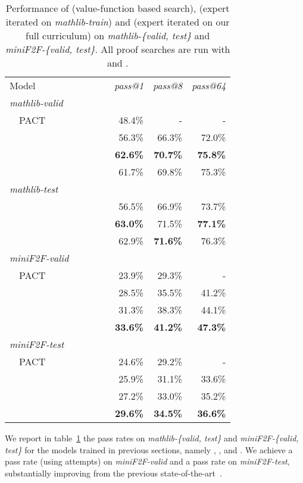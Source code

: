 \documentclass[nohyperref]{article}
\theoremstyle{plain}
\theoremstyle{definition}
\theoremstyle{remark}
\begin{document}
\begin{table}[ht]
\caption{Performance of  (value-function based search),  (expert iterated on \textit{mathlib-train}) and  (expert iterated on our full curriculum) on \textit{mathlib-\{valid, test\}} and \textit{miniF2F-\{valid,  test\}}. All proof searches are run with  and .}
\label{fig:final-results}
\begin{center}
\begin{small}
\begin{tabular}{lrrr}
\toprule
Model & \textit{pass@1} & \textit{pass@8} & \textit{pass@64} \\
\cmidrule(r){1-4}
\multicolumn{4}{l}{\textit{mathlib-valid}} \\
~~PACT~\cite{han2021proof} & 48.4\% & - & - \\
~~~~~~~~~~~~~~~~~~~~ & 56.3\% & 66.3\% & 72.0\% \\  
~~ & {\bf 62.6\%} & {\bf 70.7\%} & {\bf 75.8\%} \\  
~~ & 61.7\% & 69.8\% & 75.3\% \\  
\multicolumn{4}{l}{\textit{mathlib-test}} \\
~~ & 56.5\% & 66.9\% & 73.7\% \\  
~~ & {\bf 63.0\%} & 71.5\% & {\bf 77.1\%} \\  
~~ & 62.9\% & {\bf 71.6\%} & 76.3\% \\  
\cmidrule(r){1-4}
\multicolumn{4}{l}{\textit{miniF2F-valid}} \\
~~PACT~\cite{zheng2021minif2f} & 23.9\% & 29.3\% & -\\
~~ & 28.5\% & 35.5\% & 41.2\% \\  
~~ & 31.3\% & 38.3\% & 44.1\% \\  
~~ & {\bf 33.6\%} & {\bf 41.2\%} & {\bf 47.3\%} \\  
\multicolumn{4}{l}{\textit{miniF2F-test}} \\
~~PACT~\cite{zheng2021minif2f} & 24.6\% & 29.2\% & -\\
~~ & 25.9\% & 31.1\% & 33.6\% \\  
~~ & 27.2\% & 33.0\% & 35.2\% \\  
~~ & {\bf 29.6\%} & {\bf 34.5\%} & {\bf 36.6\%} \\  
\bottomrule
\end{tabular}
\end{small}
\end{center}
\end{table}

We report in table~\ref{fig:final-results} the pass rates on \textit{mathlib-\{valid, test\}} and \textit{miniF2F-\{valid, test\}} for the  models trained in previous sections, namely , , and . We achieve a  pass rate (using  attempts) on \textit{miniF2F-valid} and a  pass rate on \textit{miniF2F-test}, substantially improving from the previous state-of-the-art~\cite{zheng2021minif2f}. 
\end{document}
